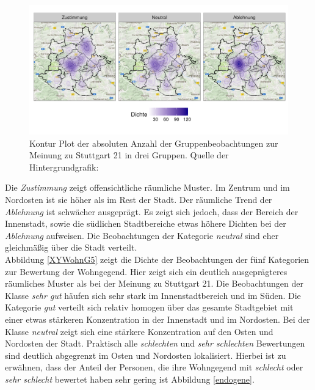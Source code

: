 \documentclass{Vorlage}
\begin{document}
\begin{figure}[h]
 \begin{center}
 \includegraphics[scale=0.8]{Pictures/XYStuttgart3.png}
 \caption{Kontur Plot der absoluten Anzahl der Gruppenbeobachtungen zur Meinung zu Stuttgart 21 in drei Gruppen. Quelle der Hintergrundgrafik: \cite{google}}
 \label{XYStuttgart3}
 \end{center}
\end{figure}

Die \textit{Zustimmung} zeigt offensichtliche räumliche Muster. Im Zentrum und im Nordosten ist sie höher als im Rest 
der Stadt. Der räumliche Trend der \textit{Ablehnung} ist schwächer ausgeprägt. Es zeigt sich jedoch, dass der Bereich 
der Innenstadt, sowie die südlichen Stadtbereiche etwas höhere Dichten bei der \textit{Ablehnung} aufweisen. Die 
Beobachtungen der Kategorie \textit{neutral} sind eher gleichmäßig über die Stadt verteilt.\\
Abbildung \ref{XYWohnG5} zeigt die Dichte der Beobachtungen der fünf Kategorien zur Bewertung der Wohngegend. Hier zeigt sich ein deutlich ausgeprägteres räumliches Muster als bei der Meinung zu Stuttgart 21. Die Beobachtungen der Klasse \textit{sehr gut} häufen sich sehr stark im Innenstadtbereich und im Süden. Die Kategorie \textit{gut} verteilt sich relativ homogen über das gesamte Stadtgebiet mit einer etwas stärkeren Konzentration in der Innenstadt und im Nordosten. Bei der Klasse \textit{neutral} zeigt sich eine stärkere Konzentration auf den Osten und Nordosten der Stadt. Praktisch alle \textit{schlechten} und \textit{sehr schlechten} Bewertungen sind deutlich abgegrenzt im Osten und Nordosten lokalisiert. Hierbei ist zu erwähnen, dass der Anteil der Personen, die ihre Wohngegend mit \textit{schlecht} oder \textit{sehr schlecht} bewertet haben sehr gering ist Abbildung \ref{endogene}.\\
\end{document}
